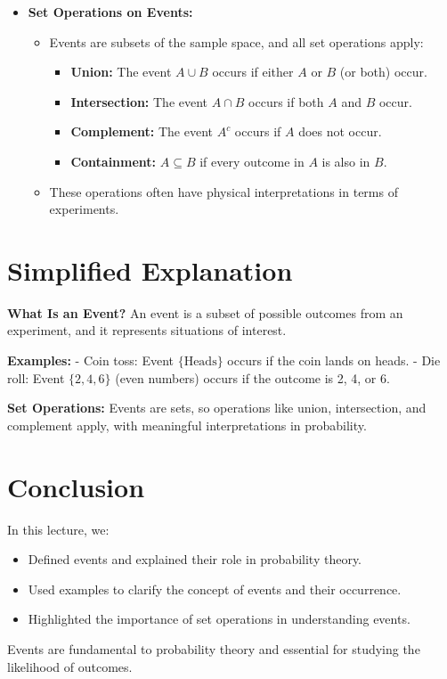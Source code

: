 \documentclass{article}
\begin{document}
\begin{itemize}
  \item \textbf{Set Operations on Events:}
    \begin{itemize}
      \item Events are subsets of the sample space, and all set operations apply:
        \begin{itemize}
          \item \textbf{Union:} The event $A \cup B$ occurs if either $A$ or $B$ (or both) occur.
          \item \textbf{Intersection:} The event $A \cap B$ occurs if both $A$ and $B$ occur.
          \item \textbf{Complement:} The event $A^c$ occurs if $A$ does not occur.
          \item \textbf{Containment:} $A \subseteq B$ if every outcome in $A$ is also in $B$.
        \end{itemize}
      \item These operations often have physical interpretations in terms of experiments.
    \end{itemize}
\end{itemize}

\section*{Simplified Explanation}

\textbf{What Is an Event?}
An event is a subset of possible outcomes from an experiment, and it represents situations of interest.

\textbf{Examples:}
- Coin toss: Event $\{\text{Heads}\}$ occurs if the coin lands on heads.
- Die roll: Event $\{2, 4, 6\}$ (even numbers) occurs if the outcome is 2, 4, or 6.

\textbf{Set Operations:}
Events are sets, so operations like union, intersection, and complement apply, with meaningful interpretations in probability.

\section*{Conclusion}

In this lecture, we:
\begin{itemize}
  \item Defined events and explained their role in probability theory.
  \item Used examples to clarify the concept of events and their occurrence.
  \item Highlighted the importance of set operations in understanding events.
\end{itemize}

Events are fundamental to probability theory and essential for studying the likelihood of outcomes.
\end{document}
